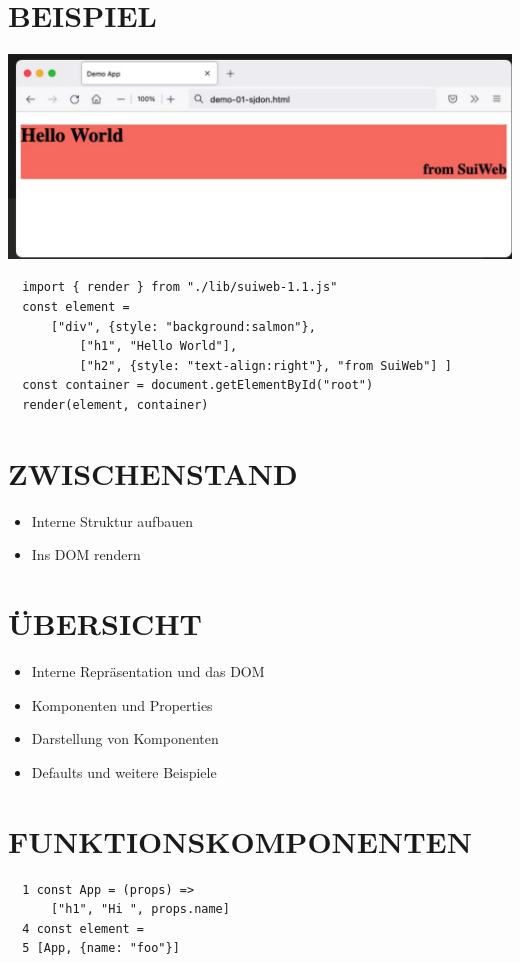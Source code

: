   \section*{BEISPIEL}
  \begin{center}
  \includegraphics[width=\linewidth]{images/2025_01_02_254b5e4c52d090c313e1g-18}
  \end{center}
  
  \begin{verbatim}
  import { render } from "./lib/suiweb-1.1.js"
  const element =
      ["div", {style: "background:salmon"},
          ["h1", "Hello World"],
          ["h2", {style: "text-align:right"}, "from SuiWeb"] ]
  const container = document.getElementById("root")
  render(element, container)
  \end{verbatim}
  
  \section*{ZWISCHENSTAND}
  \begin{itemize}
    \item Interne Struktur aufbauen
    \item Ins DOM rendern
  \end{itemize}
  
  
  
  \section*{ÜBERSICHT}
  \begin{itemize}
    \item Interne Repräsentation und das DOM
    \item Komponenten und Properties
    \item Darstellung von Komponenten
    \item Defaults und weitere Beispiele
  \end{itemize}
  
  \section*{FUNKTIONSKOMPONENTEN}
  \begin{verbatim}
  1 const App = (props) =>
      ["h1", "Hi ", props.name]
  4 const element =
  5 [App, {name: "foo"}]
  \end{verbatim}
  
